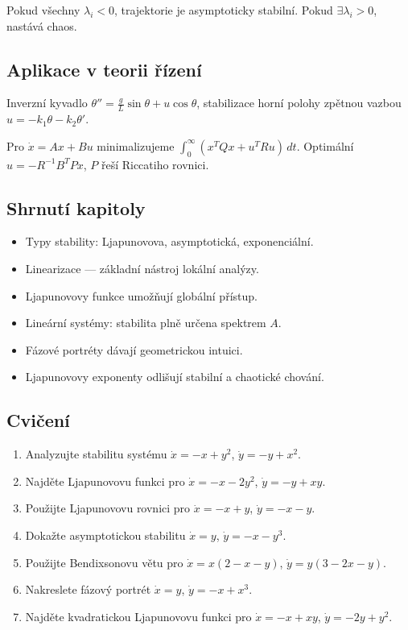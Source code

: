 \begin{theorem}[Interpretace]
\label{vet:lyap-exponenty}
Pokud všechny $\lambda_i<0$, trajektorie je asymptoticky stabilní. Pokud $\exists\lambda_i>0$, nastává chaos.
\end{theorem}

\spc

\subsection{Aplikace v teorii řízení}
\label{sec:aplikace-rizeni}

\begin{example}
\label{ex:invert-pendulum}
Inverzní kyvadlo $\theta''=\tfrac gL\sin\theta+u\cos\theta$, stabilizace horní polohy zpětnou vazbou $u=-k_1\theta-k_2\theta'$.
\end{example}

\begin{example}
\label{ex:lqr}
Pro $\dot x=Ax+Bu$ minimalizujeme $\int_0^\infty(x^TQx+u^TRu)\,dt$. Optimální $u=-R^{-1}B^TPx$, $P$ řeší Riccatiho rovnici.
\end{example}

\spc

\subsection*{Shrnutí kapitoly}
\begin{itemize}
\item Typy stability: Ljapunovova, asymptotická, exponenciální.
\item Linearizace — základní nástroj lokální analýzy.
\item Ljapunovovy funkce umožňují globální přístup.
\item Lineární systémy: stabilita plně určena spektrem $A$.
\item Fázové portréty dávají geometrickou intuici.
\item Ljapunovovy exponenty odlišují stabilní a chaotické chování.
\end{itemize}

\spc

\subsection*{Cvičení}
\begin{enumerate}
\item Analyzujte stabilitu systému $\dot x=-x+y^2$, $\dot y=-y+x^2$.
\item Najděte Ljapunovovu funkci pro $\dot x=-x-2y^2$, $\dot y=-y+xy$.
\item Použijte Ljapunovovu rovnici pro $\dot x=-x+y$, $\dot y=-x-y$.
\item Dokažte asymptotickou stabilitu $\dot x=y$, $\dot y=-x-y^3$.
\item Použijte Bendixsonovu větu pro $\dot x=x(2-x-y)$, $\dot y=y(3-2x-y)$.
\item Nakreslete fázový portrét $\dot x=y$, $\dot y=-x+x^3$.
\item Najděte kvadratickou Ljapunovovu funkci pro $\dot x=-x+xy$, $\dot y=-2y+y^2$.
\end{enumerate}
